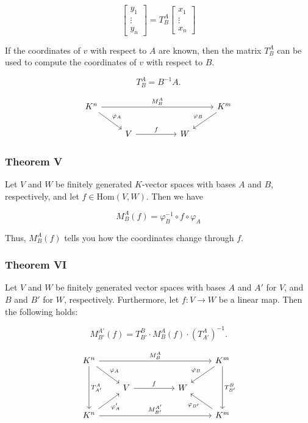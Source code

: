 \[
    \begin{bmatrix}
    y_1 \\
    \vdots \\
    y_n
    \end{bmatrix}
    =
    T_B^A
    \begin{bmatrix}
    x_1 \\
    \vdots \\
    x_n
    \end{bmatrix}
\]

If the coordinates of \( v \) with respect to \(A\) are known, then the matrix \( T_B^A \) can be used to compute the coordinates of \( v \) with respect to \(B\).

\[ 
    T_B^A = B^{-1}A. 
\]

\[
    \begin{tikzcd}
        K^n \arrow[rrrr, "M_{B}^{A}"] \arrow[rd, "\varphi_A"] &                   &  &   & K^m \arrow[ld, "\varphi_B"'] \\
                                                              & V \arrow[rr, "f"] &  & W &                             
        \end{tikzcd}
\]

\subsubsection{Theorem V}
 
Let \( V \) and \( W \) be finitely generated \( K \)-vector spaces with 
bases \(A\) and \(B\), respectively, and let \( f \in \mathrm{Hom}(V, W) \).
Then we have

\[
    M_B^A(f) = \varphi_B^{-1} \circ f \circ \varphi_A
\]

Thus, \( M_B^A(f) \) tells you how the coordinates change through \(f\).

\subsubsection{Theorem VI} 

Let \( V \) and \( W \) be finitely generated vector spaces with bases \(A\) and \( A' \) 
for \( V \), and \(B\) and \( B' \) for \( W \), respectively.  Furthermore, let \( f: V \to W \) be 
a linear map. Then the following holds:

\[
    M_{B'}^{A'}(f) = T_{B'}^{B} \cdot M_{B}^{A}(f) \cdot {\left( T_{A'}^{A} \right)}^{-1}.
\]

\[
    \begin{tikzcd}
        K^n \arrow[dd, "T_{A'}^{A}"] \arrow[rrrr, "M_{B}^{A}"] \arrow[rd, "\varphi_A"] &                   &  &   & K^m \arrow[dd, "T_{B'}^{B}"] \arrow[ld, "\varphi_B"'] \\
                                                                                       & V \arrow[rr, "f"] &  & W &                                                       \\
        K^n \arrow[rrrr, "M_{B'}^{A'}"] \arrow[ru, "\varphi_{A}'"']                    &                   &  &   & K^m \arrow[lu, "\varphi_{B'}"]                       
    \end{tikzcd}
\]

